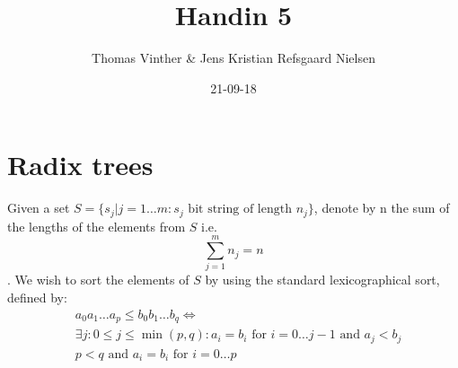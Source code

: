 \documentclass{article}
\theoremstyle{remark}
\numberwithin{equation}{section}
\begin{document}
	\author{Thomas Vinther \& Jens Kristian Refsgaard Nielsen}
	\title{Handin 5}
	\date{21-09-18}
	\maketitle
\section{Radix trees}
Given a set $S= \{s_j | j=1\dots m : s_j \text{ bit string of length }n_j \}$, denote by n the sum of the lengths of the elements from $S$ i.e. 
\begin{equation}\label{n}
	\sum_{j=1}^{m} n_j = n
\end{equation}.
We wish to sort the elements of $S$ by using the standard lexicographical sort, defined by:
\begin{align}
	&a_0a_1\dots a_p \leq b_0b_1\dots b_q \iff\\
	&\exists j: 0\leq j\leq \min(p,q) : a_i = b_i \text{ for }i=0\dots j-1 \text{ and } a_j < b_j\\
	&p<q \text{ and } a_i = b_i \text{ for } i=0\dots p
\end{align}
\end{document}
